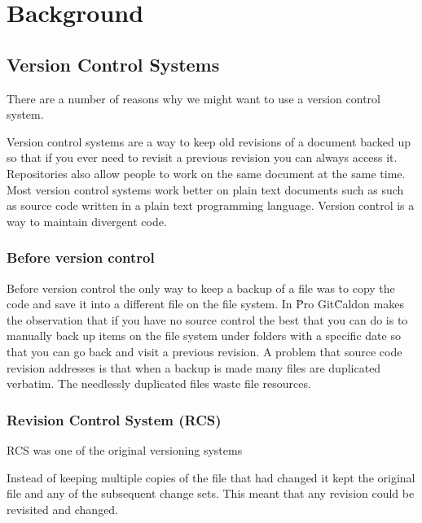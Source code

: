 \chapter{Background}

\section{Version Control Systems}
There are a number of reasons why we might want to use a version control system.

Version control systems are a way to keep old revisions of a document backed up so that if you ever need to revisit a previous revision you can always access it.
Repositories also allow people to work on the same document at the same time.
Most version control systems work better on plain text documents such as such as source code written in a plain text programming language.
Version control is a way to maintain divergent code.


\subsection{Before version control}
Before version control the only way to keep a backup of a file was to copy the code and save it into a different file on the file system.
In \"Pro Git\" Caldon makes the observation that if you have no source control the best that you can do is to manually back up items on the file system under folders with a specific date so that you can go back and visit a previous revision.  A problem that source code revision addresses is that when a backup is made many files are duplicated verbatim.  The needlessly duplicated files waste file resources.

\subsection{Revision Control System (RCS)}
RCS was one of the original versioning systems 

Instead of keeping multiple copies of the file that had changed it kept the original file and any of the subsequent change sets.
This meant that any revision could be revisited and changed.

